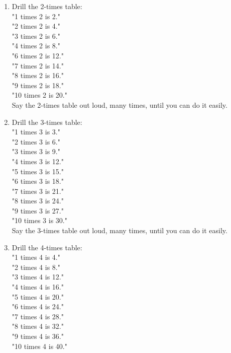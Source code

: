 \documentclass[12pt]{article}
\begin{document}
\begin{enumerate}
\item Drill the 2-times table:\\

"1 times 2 is 2."\\
"2 times 2 is 4."\\
"3 times 2 is 6."\\
"4 times 2 is 8."\\
"6 times 2 is 12."\\
"7 times 2 is 14."\\
"8 times 2 is 16."\\
"9 times 2 is 18."\\
"10 times 2 is 20."\\

Say the 2-times table out loud, many times, until you can do it easily.\\

\item Drill the 3-times table:\\

"1 times 3 is 3."\\
"2 times 3 is 6."\\
"3 times 3 is 9."\\
"4 times 3 is 12."\\
"5 times 3 is 15."\\
"6 times 3 is 18."\\
"7 times 3 is 21."\\
"8 times 3 is 24."\\
"9 times 3 is 27."\\
"10 times 3 is 30."\\

Say the 3-times table out loud, many times, until you can do it easily.\\

\item Drill the 4-times table:\\

"1 times 4 is 4."\\
"2 times 4 is 8."\\
"3 times 4 is 12."\\
"4 times 4 is 16."\\
"5 times 4 is 20."\\
"6 times 4 is 24."\\
"7 times 4 is 28."\\
"8 times 4 is 32."\\
"9 times 4 is 36."\\
"10 times 4 is 40."\\


\end{enumerate}
\end{document}
